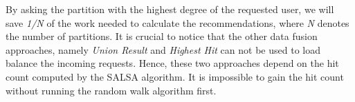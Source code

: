 By asking the partition with the highest degree of the requested user, we will save \emph{1/N} of the work needed to calculate the recommendations, where \emph{N} denotes the number of partitions. It is crucial to notice that the other data fusion approaches, namely \emph{Union Result} and \emph{Highest Hit} can not be used to load balance the incoming requests. Hence, these two approaches depend on the hit count computed by the SALSA algorithm. It is impossible to gain the hit count without running the random walk algorithm first.

